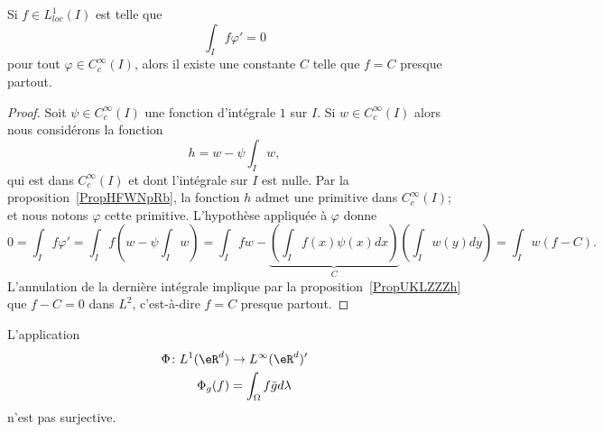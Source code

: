 \begin{proposition} \label{PropLGoLtcS}
	Si \( f\in L^1_{loc}(I)\) est telle que
	\begin{equation}
		\int_If\varphi'=0
	\end{equation}
	pour tout \( \varphi\in  C^{\infty}_c(I)\), alors il existe une constante \( C\) telle que \( f=C\) presque partout.
\end{proposition}

\begin{proof}
	Soit \( \psi\in C^{\infty}_c(I)\) une fonction d'intégrale \( 1\) sur \( I\). Si \( w\in C^{\infty}_c(I)\) alors nous considérons la fonction
	\begin{equation}
		h=w-\psi\int_Iw,
	\end{equation}
	qui est dans \(  C^{\infty}_c(I)\) et dont l'intégrale sur \( I\) est nulle. Par la proposition~\ref{PropHFWNpRb}, la fonction \( h\) admet une primitive dans \(  C^{\infty}_c(I)\); et nous notons \( \varphi\) cette primitive. L'hypothèse appliquée à \( \varphi\) donne
	\begin{equation}
		0=\int_If\varphi'=\int_If\left( w-\psi\int_Iw \right)=\int_Ifw-\underbrace{\left( \int_If(x)\psi(x)dx \right)}_C\left( \int_Iw(y)dy \right)=\int_Iw(f-C).
	\end{equation}
	L'annulation de la dernière intégrale implique par la proposition~\ref{PropUKLZZZh} que \( f-C=0\) dans \( L^2\), c'est-à-dire \( f=C\) presque partout.
\end{proof}

\begin{proposition}     \label{PROPooXNRRooUdgFPr}
	L'application
	\begin{equation}
		\begin{aligned}
			\Phi\colon L^1(\eR^d) & \to L^{\infty}(\eR^d)'        \\
			\Phi_g(f)             & =\int_{\Omega}f\bar gd\lambda
		\end{aligned}
	\end{equation}
	n'est pas surjective.
\end{proposition}

